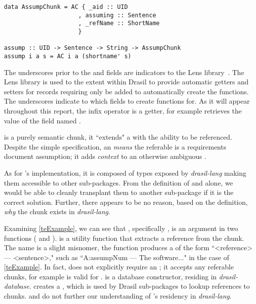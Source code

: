 \begin{tcolorbox}[breakable, toprule at break=0pt, bottomrule at break=0pt]
\begin{verbatim}
data AssumpChunk = AC { _aid :: UID
	                 , assuming :: Sentence
	                 , _refName :: ShortName
	                 }

assump :: UID -> Sentence -> String -> AssumpChunk
assump i a s = AC i a (shortname' s)
\end{verbatim}
\end{tcolorbox}

The underscores prior to the  and  fields are indicators to the Lens library~\cite{Lenses}. The Lens library is used to the extent within Drasil to provide automatic getters and setters for records requiring only  be added to automatically create the functions. The underscores indicate to  which fields to create functions for. As it will appear throughout this report, the infix operator  is a getter, for example  retrieves the value of the field named .

 is a purely semantic chunk, it ``extends" a  with the ability to be referenced. Despite the simple specification, an  \textit{means} the referable  is a requirements document assumption; it adds \textit{context} to an otherwise ambiguous .

As for 's implementation, it is composed of types exposed by \textit{drasil-lang} making them accessible to other sub-packages. From the definition of  and  alone, we would be able to cleanly transplant them to another sub-package if it is the correct solution. Further, there appears to be no reason, based on the definition, \textit{why} the chunk exists in \textit{drasil-lang}.

Examining \autoref{teExample}, we can see that , specifically , is an argument in two functions ( and ).  is a utility function that extracts a reference from the chunk. The name is a slight misnomer, the function produces a  of the form ``<reference> --- <sentence>," such as ``A:assumpNum --- The software..." in the case of \autoref{teExample}. In fact,  does not explicitly require an ; it accepts any referable chunks, for example  is valid for .  is a database constructor, residing in \textit{drasil-database}.  creates a , which is used by Drasil sub-packages to lookup references to chunks.  and  do not further our understanding of 's residency in \textit{drasil-lang}.

